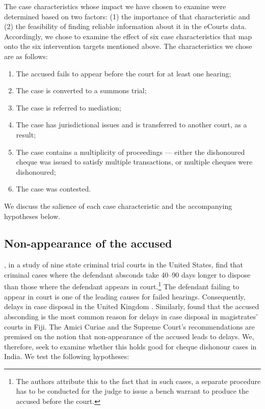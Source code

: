 The case characteristics whose impact we have chosen to examine were determined based on two factors: (1) the importance of that characteristic and (2) the feasibility of finding reliable information about it in the eCourts data. Accordingly, we chose to examine the effect of six case characteristics that map onto the six intervention targets mentioned above. The characteristics we chose are as follows:
\begin{enumerate}
\item The accused fails to appear before the court for at least one hearing;
\item The case is converted to a summons trial;
\item The case is referred to mediation;
\item The case has jurisdictional issues and is transferred to another court, as a result;
\item The case contains a multiplicity of proceedings --- either the dishonoured cheque was issued to satisfy multiple transactions, or multiple cheques were dishonoured;
\item The case was contested.
\end{enumerate}

We discuss the salience of each case characteristic and the accompanying hypotheses below.

\subsection{Non-appearance of the accused} 
\label{sec:non-appe-accus}

\textcite{ostrom2000efficiency}, in a study of nine state criminal trial courts in the United States, find that criminal cases where the defendant absconds take 40--90 days longer to dispose than those where the defendant appears in court.\footnote{The authors attribute this to the fact that in such cases, a separate procedure has to be conducted for the judge to issue a bench warrant to produce the accused before the court.} The defendant failing to appear in court is one of the leading causes for failed hearings. Consequently, delays in case disposal in the United Kingdom \autocite{crownProsecutionService2006_magistrateCourtEfficiency}. Similarly, \textcite{llangasinghe1988_fijiJudicialDelays} found that the accused absconding is the most common reason for delays in case disposal in magistrates' courts in Fiji. The Amici Curiae and the Supreme Court's recommendations are premised on the notion that non-appearance of the accused leads to delays. We, therefore, seek to examine whether this holds good for cheque dishonour cases in India. We test the following hypotheses:

